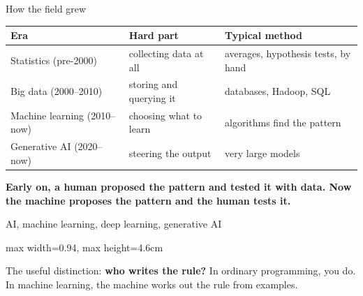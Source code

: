 \documentclass[10pt,aspectratio=169]{beamer}
\newcommand{\keyidea}[1]{%
  \begin{block}{}
  \centering\Large\bfseries\color{dsblue} #1
  \end{block}%
}
\begin{document}
\begin{frame}{How the field grew}
\begin{table}
\small
\begin{tabularx}{\linewidth}{@{}lXX@{}}
\toprule
\textbf{Era} & \textbf{Hard part} & \textbf{Typical method} \\
\midrule
Statistics (pre-2000) & collecting data at all & averages, hypothesis tests, by hand \\
Big data (2000--2010) & storing and querying it & databases, Hadoop, SQL \\
Machine learning (2010--now) & choosing what to learn & algorithms find the pattern \\
Generative AI (2020--now) & steering the output & very large models \\
\bottomrule
\end{tabularx}
\end{table}
\vspace{0.3cm}
\keyidea{Early on, a human proposed the pattern and tested it with data. Now the machine proposes the pattern and the human tests it.}
\end{frame}

\begin{frame}{AI, machine learning, deep learning, generative AI}
\begin{center}
\begin{adjustbox}{max width=0.94\linewidth, max height=4.6cm}
\end{adjustbox}
\end{center}
\vspace{-0.2cm}
The useful distinction: \textbf{who writes the rule?} In ordinary programming, you do. In machine learning, the machine works out the rule from examples.
\end{frame}
\end{document}
